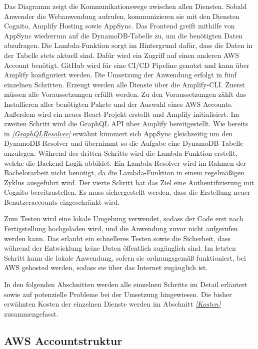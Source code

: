 Das Diagramm zeigt die Kommunikationswege zwischen allen Diensten.
Sobald Anwender die Webanwendung aufrufen, kommunizieren sie mit den Diensten Cognito, Amplify Hosting sowie AppSync.
Das Frontend greift mithilfe von AppSync wiederrum auf die DynamoDB-Tabelle zu, um die benötigten Daten abzufragen.
Die Lambda-Funktion sorgt im Hintergrund dafür, dass die Daten in der Tabelle stets aktuell sind.
Dafür wird ein Zugriff auf einen anderen AWS Account benötigt.
GitHub wird für eine CI/CD Pipeline genutzt und kann über Amplify konfiguriert werden.
\clearpage
Die Umsetzung der Anwendung erfolgt in fünf einzelnen Schritten.
Erzeugt werden alle Dienste über die Amplify-CLI.
Zuerst müssen alle Voraussetzungen erfüllt werden.
Zu den Voraussetzungen zählt das Installieren aller benötigten Pakete und der Auswahl eines AWS Accounts.
Außerdem wird ein neues React-Projekt erstellt und Amplify initialisiert.
Im zweiten Schritt wird die GraphQL API über Amplify bereitgestellt.
Wie bereits in \textit{\ref{GraphQLResolver} } erwähnt kümmert sich AppSync gleichzeitig um den DynamoDB-Resolver und übernimmt so die Aufgabe eine DynamoDB-Tabelle anzulegen.
Während des dritten Schritts wird die Lambda-Funktion erstellt, welche die Backend-Logik abbildet.
Ein Lambda-Resolver wird im Rahmen der Bachelorarbeit nicht benötigt, da die Lambda-Funktion in einem regelmäßigen Zyklus ausgeführt wird.
Der vierte Schritt hat das Ziel eine Authentifizierung mit Cognito bereitzustellen.
Es muss sichergestellt werden, dass die Erstellung neuer Benutzeraccounts eingeschränkt wird.

Zum Testen wird eine lokale Umgebung verwendet, sodass der Code erst nach Fertigstellung hochgeladen wird, und die Anwendung zuvor nicht aufgerufen werden kann.
Das erlaubt ein schnelleres Testen sowie die Sicherheit, dass während der Entwicklung keine Daten öffentlich zugänglich sind.
Im letzten Schritt kann die lokale Anwendung, sofern sie ordnungsgemäß funktioniert, bei AWS gehosted werden, sodass sie über das Internet zugänglich ist.


In den folgenden Abschnitten werden alle einzelnen Schritte im Detail erläutert sowie auf potenzielle Probleme bei der Umsetzung hingewiesen.
Die bisher erwähnten Kosten der einzelnen Dienste werden im Abschnitt \textit{\ref{Kosten} } zusammengefasst.

\subsection{AWS Accountstruktur}
\label{Accountstruktur}

